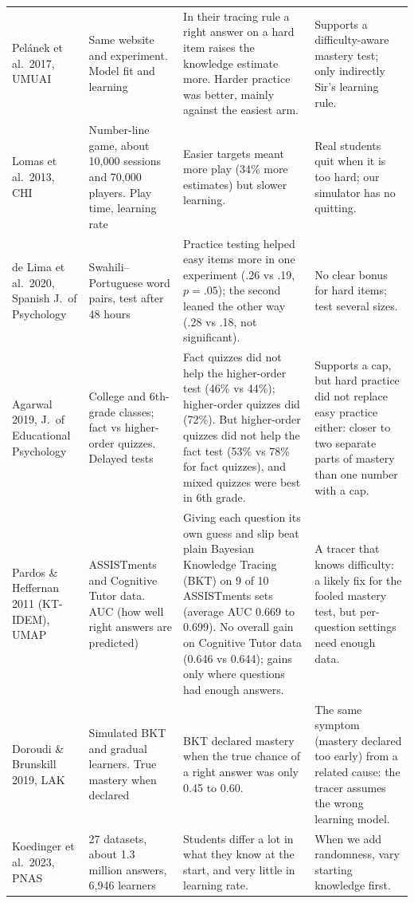 \documentclass[11pt,a4paper]{article}
\newcommand{\pc}{\%}
\begin{document}
{\begin{longtable}{>{\raggedright}p{2.7cm}>{\raggedright}p{3.1cm}>{\raggedright}p{5.4cm}>{\raggedright\arraybackslash}p{4.3cm}}
Pel\'anek et al.\ 2017, UMUAI & Same website and experiment. Model fit and learning & In their tracing rule a right answer on a hard item raises the knowledge estimate more. Harder practice was better, mainly against the easiest arm. & Supports a difficulty-aware mastery test; only indirectly Sir's learning rule.\\
Lomas et al.\ 2013, CHI & Number-line game, about 10,000 sessions and 70,000 players. Play time, learning rate & Easier targets meant more play (34\pc{} more estimates) but slower learning. & Real students quit when it is too hard; our simulator has no quitting.\\
de Lima et al.\ 2020, Spanish J.\ of Psychology & Swahili--Portuguese word pairs, test after 48 hours & Practice testing helped easy items more in one experiment (.26 vs .19, $p = .05$); the second leaned the other way (.28 vs .18, not significant). & No clear bonus for hard items; test several sizes.\\
Agarwal 2019, J.\ of Educational Psychology & College and 6th-grade classes; fact vs higher-order quizzes. Delayed tests & Fact quizzes did not help the higher-order test (46\pc{} vs 44\pc); higher-order quizzes did (72\pc). But higher-order quizzes did not help the fact test (53\pc{} vs 78\pc{} for fact quizzes), and mixed quizzes were best in 6th grade. & Supports a cap, but hard practice did not replace easy practice either: closer to two separate parts of mastery than one number with a cap.\\
Pardos \& Heffernan 2011 (KT-IDEM), UMAP & ASSISTments and Cognitive Tutor data. AUC (how well right answers are predicted) & Giving each question its own guess and slip beat plain Bayesian Knowledge Tracing (BKT) on 9 of 10 ASSISTments sets (average AUC 0.669 to 0.699). No overall gain on Cognitive Tutor data (0.646 vs 0.644); gains only where questions had enough answers. & A tracer that knows difficulty: a likely fix for the fooled mastery test, but per-question settings need enough data.\\
Doroudi \& Brunskill 2019, LAK & Simulated BKT and gradual learners. True mastery when declared & BKT declared mastery when the true chance of a right answer was only 0.45 to 0.60. & The same symptom (mastery declared too early) from a related cause: the tracer assumes the wrong learning model.\\
Koedinger et al.\ 2023, PNAS & 27 datasets, about 1.3 million answers, 6,946 learners & Students differ a lot in what they know at the start, and very little in learning rate. & When we add randomness, vary starting knowledge first.\\

\end{longtable}}
\end{document}
